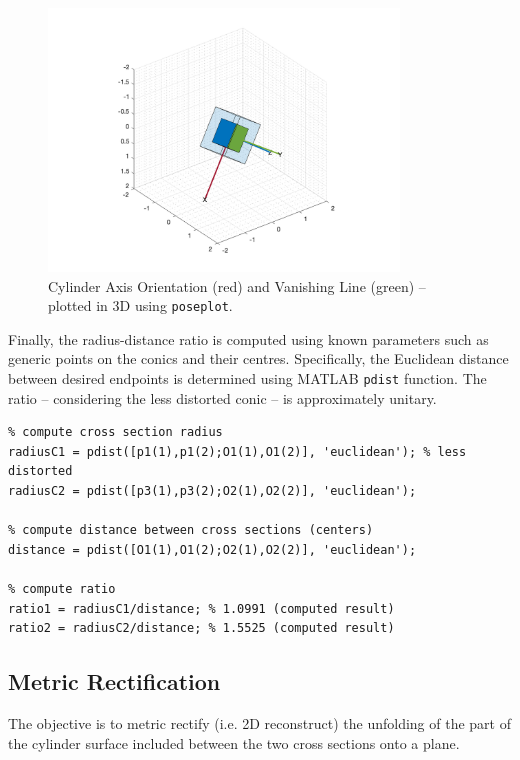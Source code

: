 \documentclass[12pt,a4paper]{article}
\begin{document}
\begin{figure}[H]
    \centering
    \includegraphics[width=0.83\textwidth]{Images/axis_orientation.png}
    \cprotect\caption[Cylinder Axis Orientation.]{Cylinder Axis Orientation (red) and Vanishing Line (green) -- plotted in 3D using \verb|poseplot|.}
    \label{fig:axisImage}
\end{figure}

Finally, the radius-distance ratio is computed using known parameters such as generic points on the conics and their centres. Specifically, the Euclidean distance between desired endpoints is determined using MATLAB \verb|pdist| function. The ratio -- considering the less distorted conic --  is approximately unitary.

\begin{verbatim}
% compute cross section radius
radiusC1 = pdist([p1(1),p1(2);O1(1),O1(2)], 'euclidean'); % less distorted
radiusC2 = pdist([p3(1),p3(2);O2(1),O2(2)], 'euclidean');

% compute distance between cross sections (centers)
distance = pdist([O1(1),O1(2);O2(1),O2(2)], 'euclidean');

% compute ratio
ratio1 = radiusC1/distance; % 1.0991 (computed result)
ratio2 = radiusC2/distance; % 1.5525 (computed result)
\end{verbatim}

\pagebreak

\subsection{Metric Rectification}
\label{sec:shapeReconstruction}
The objective is to metric rectify (i.e. 2D reconstruct) the unfolding of the part of the cylinder surface included between the two cross sections onto a plane.\\
\end{document}
